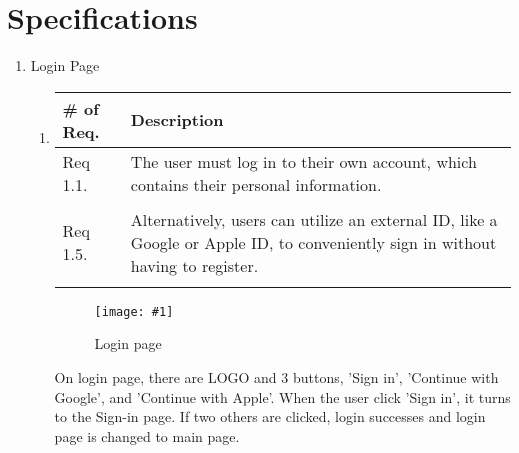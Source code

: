 \section{\Large{Specifications}}
\begin{enumerate}[label=\arabic*.]

    \newcommand{\addImage}[2]{
        \begin{figure}[ht]
            \begin{center}
                \texttt{[image: \#1]}
                \caption{#2} %
                \renewcommand{\thefigure}{\thesubsection.\arabic{figure}}
            \end{center}
        \end{figure}
    }

    \newcommand{\requirementTable}[1]{
        \begin{table}[H]
            \center
            \begin{tabular}{m{1.4cm} m{5.5cm}}
                \toprule
                \# of Req. & Description \\
                \midrule
                #1
                \bottomrule
            \end{tabular}
        \end{table}
    }

    \item {\large{Login Page}}
          \begin{enumerate}[label*={\arabic*.},ref=\theenumi.\arabic*]
              \setlength{\itemindent}{0.5cm}
              \item
                    \requirementTable{
                        Req 1.1. & The user must log in to their own account, which contains their personal information.\\\\
                        Req 1.5. & Alternatively, users can utilize an external ID, like a Google or Apple ID, to conveniently sign in without having to register.\\\\
                    }
                    \addImage{
                        imgs/specification/login.png
                    }{
                        Login page
                    }
                    On login page, there are LOGO and 3 buttons, 'Sign in', 'Continue with Google', and 'Continue with Apple'. When the user click 'Sign in', it turns to the Sign-in page. If two others are clicked, login successes and login page is changed to main page.\\\\


\end{enumerate}
\end{enumerate}
